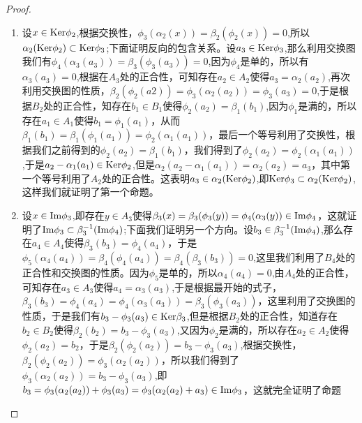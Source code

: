 \begin{proof}
\begin{enumerate}
    \item 设$x\in{\rm Ker}\phi_{2}$,根据交换性，$\phi_{3}(\alpha_{2}(x))=\beta_{2}(\phi_{2}(x))=0$,所以$\alpha_{2}({\rm Ker}\phi_{2})\subset {\rm Ker}\phi_{3}$;下面证明反向的包含关系。设$a_{3}\in {\rm Ker}\phi_{3}$,那么利用交换图我们有$\phi_{4}(\alpha_{3}(a_{3}))=\beta_{3}(\phi_{3}(a_{3}))=0$,因为$\phi_{4}$是单的，所以有$\alpha_{3}(a_{3})=0$,根据在$A_{3}$处的正合性，可知存在$a_{2}\in A_{2}$使得$a_{3}=\alpha_{2}(a_{2})$,再次利用交换图的性质，$\beta_{2}(\phi_{2}(a{2}))=\phi_{3}(\alpha_{2}(a_{2}))=\phi_{3}(a_{3})=0$,于是根据$B_{2}$处的正合性，知存在$b_{1}\in B_{1}$使得$\phi_{2}(a_{2})=\beta_{1}(b_{1})$,因为$\phi_{1}$是满的，所以存在$a_{1}\in A_{1}$使得$b_{1}=\phi_{1}(a_{1})$，从而$\beta_{1}(b_{1})=\beta_{1}(\phi_{1}(a_{1}))=\phi_{2}(\alpha_{1}(a_{1}))$，最后一个等号利用了交换性，根据我们之前得到的$\phi_{2}(a_{2})=\beta_{1}(b_{1})$，我们得到了$\phi_{2}(a_{2})=\phi_{2}(\alpha_{1}(a_{1}))$,于是$a_{2}-\alpha_{1}(a_{1})\in {\rm Ker}\phi_{2}$,但是$\alpha_{2}(a_{2}-\alpha_{1}(a_{1}))=\alpha_{2}(a_{2})=a_{3}$，其中第一个等号利用了$A_{2}$处的正合性。这表明$a_{3}\in \alpha_{2}({\rm Ker} \phi_{2})$,即${\rm Ker}\phi_{3}\subset \alpha_{2}({\rm Ker} \phi_{2})$,这样我们就证明了第一个命题。
    \item 设$x\in{\rm Im}\phi_{3}$,即存在$y\in A_{3}$使得$\beta_{3}(x)=\beta_{3}(\phi_{3}(y))=\phi_{4}(\alpha_{3}(y))\in {\rm Im}\phi_{4}$，这就证明了${\rm Im}\phi_{3}\subset \beta_{3}^{-1}({\rm Im} \phi_{4})$;下面我们证明另一个方向。设$b_{3}\in\beta_{3}^{-1}({\rm Im}\phi_{4})$,那么存在$a_{4}\in A_{4}$使得$\beta_{3}(b_{3})=\phi_{4}(a_{4})$，于是$\phi_{5}(\alpha_{4}(a_{4}))=\beta_{4}(\phi_{4}(a_{4}))=\beta_{4}(\beta_{3}(b_{3}))=0$,这里我们利用了$B_{4}$处的正合性和交换图的性质。因为$\phi_{5}$是单的，所以$\alpha_{4}(a_{4})=0$,由$A_{4}$处的正合性，可知存在$a_{3}\in A_{3}$使得$a_{4}=\alpha_{3}(a_{3})$,于是根据最开始的式子，$\beta_{3}(b_{3})=\phi_{4}(a_{4})=\phi_{4}(\alpha_{3}(a_{3}))=\beta_{3}(\phi_{3}(a_{3}))$，这里利用了交换图的性质，于是我们有$b_{3}-\phi_{3}(a_{3})\in {\rm Ker}\beta_{3}$,但是根据$B_{2}$处的正合性，知道存在$b_{2}\in B_{2}$使得$\beta_{2}(b_{2})=b_{3}-\phi_{3}(a_{3})$,又因为$\phi_{2}$是满的，所以存在$a_{2}\in A_{2}$使得$\phi_{2}(a_{2})=b_{2}$，于是$\beta_{2}(\phi_{2}(a_{2}))=b_{3}-\phi_{3}(a_{3})$,根据交换性，$\beta_{2}(\phi_{2}(a_{2}))=\phi_{3}(\alpha_{2}(a_{2}))$，所以我们得到了$\phi_{3}(\alpha_{2}(a_{2}))=b_{3}-\phi_{3}(a_{3})$,即$b_{3}=\phi_{3}(\alpha_{2}(a_{2}))+\phi_{3}(a_{3})=\phi_{3}(\alpha_{2}(a_{2})+a_{3})\in {\rm Im}\phi_{3}$，这就完全证明了命题
\end{enumerate}
\end{proof}
